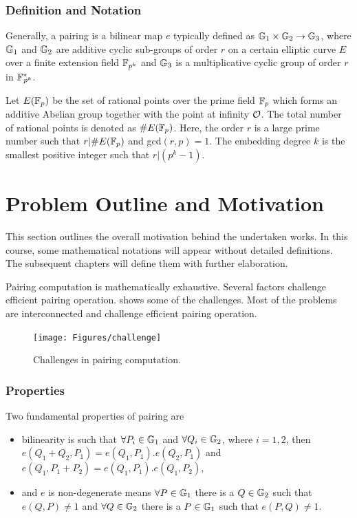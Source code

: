 \subsubsection*{Definition and Notation}
Generally, a pairing is a bilinear map $e$ typically defined as  ${\mathbb{G}}_{1} \times {\mathbb{G}}_{2} \to {\mathbb{G}}_{3}$, where ${\mathbb{G}}_{1}$ and ${\mathbb{G}}_{2}$ are additive cyclic sub-groups of  order $r$  on a certain elliptic curve $E$ over a finite extension field $\mathbb{F}_{p^k}$ and ${\mathbb{G}}_{3}$ is a multiplicative cyclic group of order $r$ in ${{\mathbb{F}}^{\ast}}_{\!\!\!p^{k}}$.

Let $E({\mathbb{F}}_{p})$ be the set of rational points over the prime field ${\mathbb{F}}_{p}$ which forms an additive Abelian group together with the point at infinity $\cal{O}$. The total number of rational points is denoted as $\#E({\mathbb{F}}_{p})$. Here, the order $r$ is a large prime number such that $r | \#E({\mathbb{F}}_{p})$ and gcd$(r,p)=1$. The embedding degree $k$ is the smallest positive integer such that $r | (p^k -1)$.

\section{Problem Outline and Motivation}
This section outlines the overall motivation behind the undertaken works.
In this course, some mathematical notations will appear without detailed definitions.
The subsequent chapters will define them with further elaboration.

Pairing computation is mathematically exhaustive.
Several factors challenge efficient pairing operation.
 shows some of the challenges. 
Most of the problems are interconnected and challenge efficient pairing operation.


\begin{figure}
	\centering
	\texttt{[image: Figures/challenge]}
	\caption{Challenges in pairing computation.}
	\label{fig:ch:intro:pairing_challenge}
\end{figure}

\subsubsection*{Properties}
Two fundamental properties of pairing are
\begin{itemize}
	\item bilinearity is such that $\forall P_i \in {\mathbb{G}}_{1}$ and $\forall Q_i \in {\mathbb{G}}_{2}$, where $i= 1, 2$, then $e(Q_1+Q_2,P_1) = e(Q_1,P_1). e(Q_2,P_1)$ and $e(Q_1,P_1+P_2) = e(Q_1,P_1). e(Q_1,P_2)$,
	\item and $e$ is non-degenerate means $\forall P \in {\mathbb{G}}_{1}$ there is a $Q \in {\mathbb{G}}_{2}$ such that  $e(Q,P) \neq 1$ and $\forall Q \in {\mathbb{G}}_{2}$ there is a $P \in {\mathbb{G}}_{1}$ such that $e(P,Q) \neq 1$.
\end{itemize}

